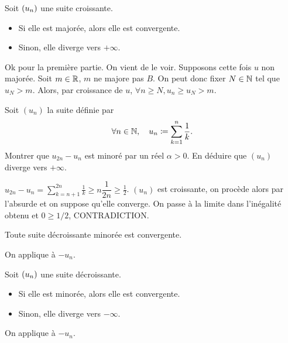 \documentclass{magnoliaold}
\begin{document}
\begin{proposition}[utile=-3]
Soit $\left(u_n\right)$ une suite croissante.
\begin{itemize}
\item Si elle est majorée, alors elle est convergente.
\item Sinon, elle diverge vers $+\infty$.
\end{itemize}
\end{proposition}

\begin{preuve}
Ok pour la première partie. On vient de le voir.
Supposons cette fois $u$ non majorée. Soit $m\in\mathbb{R}$, $m$ ne majore pas $B$. On peut donc fixer $N\in\mathbb{N}$ tel que $u_N>m$. Alors, par croissance de $u$, $\forall n\geq N, u_n\geq u_N>m$.
\end{preuve}


\begin{exoUnique}
\exo Soit $(u_n)$ la suite définie par
  \[\forall n\in\mathbb{N} ,\quad u_n\coloneqq\sum_{k=1}^n \frac{1}{k}.\]
  Montrer que $u_{2n}-u_n$ est minoré par un réel $\alpha>0$. En déduire que
  $(u_n)$ diverge vers $+\infty$.
\end{exoUnique}

\begin{sol}
$u_{2n}-u_n=\displaystyle \sum_{k=n+1}^{2n} \frac{1}{k}\geq n\dfrac{1}{2n}\geq \frac{1}{2}$.
$(u_n)$ est croissante, on procède alors par l'absurde et on suppose qu'elle converge. On passe à la limite dans l'inégalité obtenu et $0\geq 1/2$, CONTRADICTION.
\end{sol}

\begin{proposition}[utile=-3]
Toute suite décroissante minorée est convergente.
\end{proposition}

\begin{preuve}
On applique à $-u_n$.
\end{preuve}


\begin{proposition}[utile=-3]
Soit $\left(u_n\right)$ une suite décroissante.
\begin{itemize}
\item Si elle est minorée, alors elle est convergente.
\item Sinon, elle diverge vers $-\infty$.
\end{itemize}
\end{proposition}

\begin{preuve}
On applique à $-u_n$.
\end{preuve}
\end{document}
